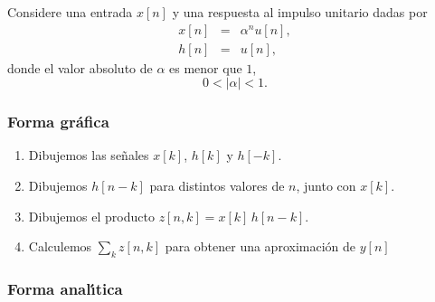 Considere una entrada $x\left[ n\right] $ y una respuesta al impulso
unitario dadas por
\begin{eqnarray}
  x\left[ n\right] &=&\alpha ^nu\left[ n\right] , \\
  h\left[ n\right] &=&u\left[ n\right] ,
\end{eqnarray}
donde el valor absoluto de $\alpha$ es menor que $1$, 
\begin{equation}
0< | \alpha | <1.
\end{equation}

\subsubsection{Forma gr\'{a}fica}

\begin{enumerate}
\item Dibujemos las se\~{n}ales $x[k]$, $h[k]$ y $h[-k]$.
        
\item Dibujemos $h[n-k]$ para distintos valores de $n$, junto con
  $x[k]$.
        
\item Dibujemos el producto $z[n,k] = x[k] \, h[n-k]$.
        
\item Calculemos $\sum_{k} z[n,k]$ para obtener una aproximaci\'{o}n de
  $y[n]$
\end{enumerate}

\subsubsection{Forma anal\'{\i}tica}

